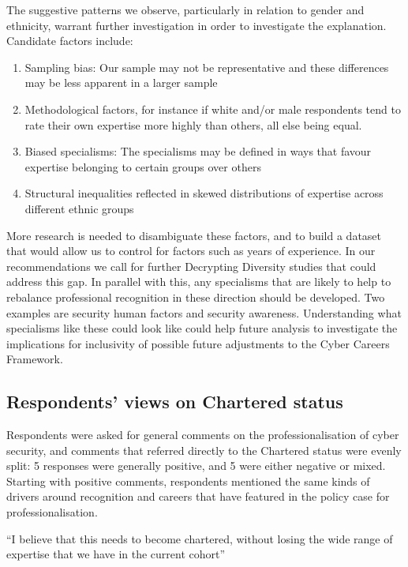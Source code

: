 \documentclass[
  a4paper,
]{book}
\begin{document}
The suggestive patterns we observe, particularly in relation to gender
and ethnicity, warrant further investigation in order to investigate the
explanation. Candidate factors include:

\begin{enumerate}
\def\labelenumi{\arabic{enumi}.}
\item
  Sampling bias: Our sample may not be representative and these
  differences may be less apparent in a larger sample
\item
  Methodological factors, for instance if white and/or male respondents
  tend to rate their own expertise more highly than others, all else
  being equal.
\item
  Biased specialisms: The specialisms may be defined in ways that favour
  expertise belonging to certain groups over others
\item
  Structural inequalities reflected in skewed distributions of expertise
  across different ethnic groups
\end{enumerate}

More research is needed to disambiguate these factors, and to build a
dataset that would allow us to control for factors such as years of
experience. In our recommendations we call for further Decrypting
Diversity studies that could address this gap. In parallel with this,
any specialisms that are likely to help to rebalance professional
recognition in these direction should be developed. Two examples are
security human factors and security awareness. Understanding what
specialisms like these could look like could help future analysis to
investigate the implications for inclusivity of possible future
adjustments to the Cyber Careers Framework.

\subsection{Respondents' views on Chartered
status}\label{respondents-views-on-chartered-status}

Respondents were asked for general comments on the professionalisation
of cyber security, and comments that referred directly to the Chartered
status were evenly split: 5 responses were generally positive, and 5
were either negative or mixed. Starting with positive comments,
respondents mentioned the same kinds of drivers around recognition and
careers that have featured in the policy case for professionalisation.

\begin{tcolorbox}[enhanced jigsaw, leftrule=.75mm, colframe=quarto-callout-note-color-frame, opacityback=0, breakable, left=2mm, rightrule=.15mm, bottomrule=.15mm, colback=white, arc=.35mm, toprule=.15mm]

``I believe that this needs to become chartered, without losing the wide
range of expertise that we have in the current cohort''

\end{tcolorbox}
\end{document}
